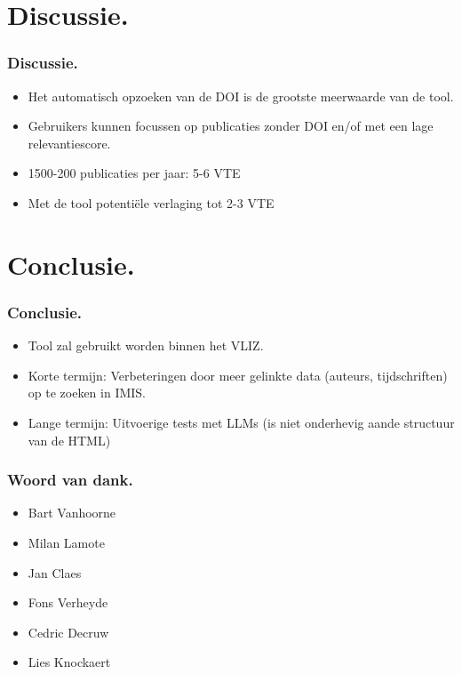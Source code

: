 \documentclass[aspectratio=169]{beamer}
\begin{document}
\section{Discussie.}

\begin{frame}
\frametitle{Discussie.}
\begin{itemize}
    \item Het automatisch opzoeken van de DOI is de grootste meerwaarde van de tool.
    \item Gebruikers kunnen focussen op publicaties zonder DOI en/of met een lage relevantiescore.
    \item 1500-200 publicaties per jaar: 5-6 VTE
    \item Met de tool potentiële verlaging tot 2-3 VTE
    \end{itemize}


\end{frame}

\section{Conclusie.}

\begin{frame}
\frametitle{Conclusie.}
\begin{itemize}
    \item Tool zal gebruikt worden binnen het VLIZ.
    \item Korte termijn: Verbeteringen door meer gelinkte data (auteurs, tijdschriften) op te zoeken in IMIS.
    \item Lange termijn: Uitvoerige tests met LLMs (is niet onderhevig aande structuur van de HTML)
\end{itemize}

\end{frame}

\begin{frame}
    \frametitle{Woord van dank.}
    \begin{itemize}
        \item Bart Vanhoorne
        \item Milan Lamote
        \item Jan Claes
        \item Fons Verheyde
        \item Cedric Decruw
        \item Lies Knockaert
    \end{itemize}
    
\end{frame}
\end{document}
